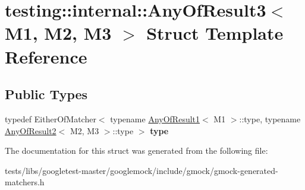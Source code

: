\hypertarget{structtesting_1_1internal_1_1AnyOfResult3}{}\section{testing\+:\+:internal\+:\+:Any\+Of\+Result3$<$ M1, M2, M3 $>$ Struct Template Reference}
\label{structtesting_1_1internal_1_1AnyOfResult3}
\subsection*{Public Types}
\begin{DoxyCompactItemize}
\item 
\mbox{\label{structtesting_1_1internal_1_1AnyOfResult3_a232b20553cc0a33a6741e85e19ef4b0c}} 
typedef Either\+Of\+Matcher$<$ typename \hyperlink{structtesting_1_1internal_1_1AnyOfResult1}{Any\+Of\+Result1}$<$ M1 $>$\+::type, typename \hyperlink{structtesting_1_1internal_1_1AnyOfResult2}{Any\+Of\+Result2}$<$ M2, M3 $>$\+::type $>$ {\bfseries type}
\end{DoxyCompactItemize}


The documentation for this struct was generated from the following file\+:\begin{DoxyCompactItemize}
\item 
tests/libs/googletest-\/master/googlemock/include/gmock/gmock-\/generated-\/matchers.\+h\end{DoxyCompactItemize}
